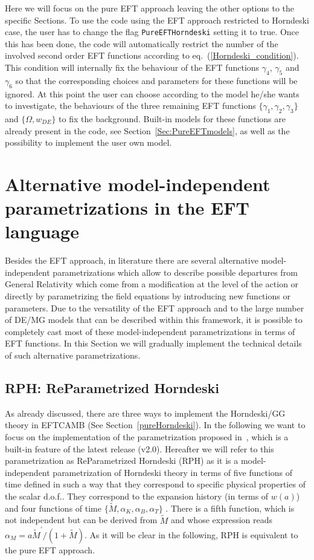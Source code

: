 \documentclass[prd,nofootinbib,showpacs]{revtex4}
\begin{document}
{Here we will focus on the pure EFT approach leaving the other options to the specific Sections. To use the code using the EFT approach restricted to Horndeski case, the user has to change the flag \verb|PureEFTHorndeski| setting it to true. Once this has been done, the code will  automatically restrict the number of the involved second order EFT functions according to eq.~(\ref{Horndeski_condition}). This condition will internally  fix the behaviour of the EFT functions $\gamma_4$, $\gamma_5$ and $\gamma_6$ so that the corresponding choices and parameters for these functions will be ignored. At this point the user can choose according to the model he/she wants to investigate, the behaviours of the three remaining EFT functions $\{\gamma_1,\gamma_2,\gamma_3\}$  and  $\{\Omega, w_{DE}\}$ to fix the background. Built-in models for these functions are already present in the code, see Section~\ref{Sec:PureEFTmodels}, as well as the possibility to implement the user own model.

\section{Alternative model-independent parametrizations in the EFT language} \label{Alternative}

Besides the EFT approach, in  literature there are several alternative model-independent parametrizations which allow to describe possible departures from General Relativity which come from a modification at the level of the action or directly by parametrizing the field equations by introducing new functions or parameters. Due to the versatility of the EFT approach and to the large number of DE/MG models that can be described within this framework, it is possible to completely cast most of these model-independent parametrizations in terms of EFT functions.   In this Section we will gradually implement the technical details of such alternative parametrizations. 

\subsection{RPH: ReParametrized Horndeski}\label{RPH}

As already discussed, there are three ways to implement the Horndeski/GG theory in EFTCAMB (See Section~\ref{pureHorndeski}). In the following we want to focus on the
implementation of the parametrization proposed in~\cite{Bellini:2014fua}, which is a built-in feature of the latest release (v2.0). Hereafter we will refer to this parametrization as ReParametrized Horndeski (RPH) as it is a model-independent parametrization of Horndeski theory in terms  of five functions of time defined in such a way that they  correspond to specific physical properties of the scalar d.o.f.. They correspond to  the expansion history (in terms of $w(a)$) and four functions of time $\{\tilde{M},\alpha_K,\alpha_B,\alpha_T\}$ . There is a fifth function, which is not independent but can  be derived from $\tilde{M}$ and  whose expression reads $\alpha_M= a \tilde{M}^\prime/(1+\tilde{M})$. As it will be clear in the following,  RPH is equivalent to the pure EFT approach.

}
\end{document}
